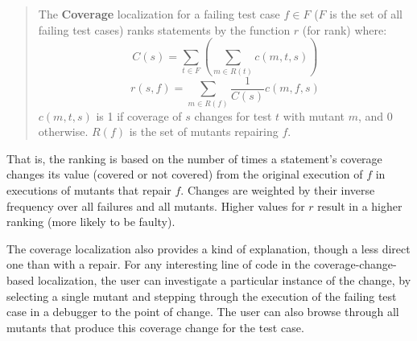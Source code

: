 \begin{quote}
The {\bf Coverage} localization for a failing test case $f \in F$ ($F$
is the set of all failing test cases) ranks
statements by the function $r$ (for rank) where:
$$C(s) = \sum_{t \in F} (\sum_{m \in R(t)} c(m,t,s))$$
$$r(s,f) = \sum_{m \in R(f)}\frac{1}{C(s)}c(m,f,s)$$
$c(m,t,s)$ is 1 if coverage of $s$ changes for test $t$
with mutant $m$, and 0 otherwise.  $R(f)$ is the set of mutants repairing $f$.
\end{quote}

That is, the ranking is based on the number of times a statement's
coverage changes its value (covered or not covered) from the original
execution of $f$ in executions of mutants that repair $f$.  Changes are weighted by their inverse frequency over all
failures and all mutants.
Higher values for $r$ result in a higher ranking (more likely to
be faulty).  

The coverage localization also provides a kind of explanation, though
a less direct one than with a repair.  For any
interesting line of code in the coverage-change-based localization,
the user can investigate a particular instance of the change,
by selecting a single mutant and stepping through the execution of the
failing test case in a debugger to the point of change.  The user can also
browse through all mutants that produce this coverage change for the test
case.

